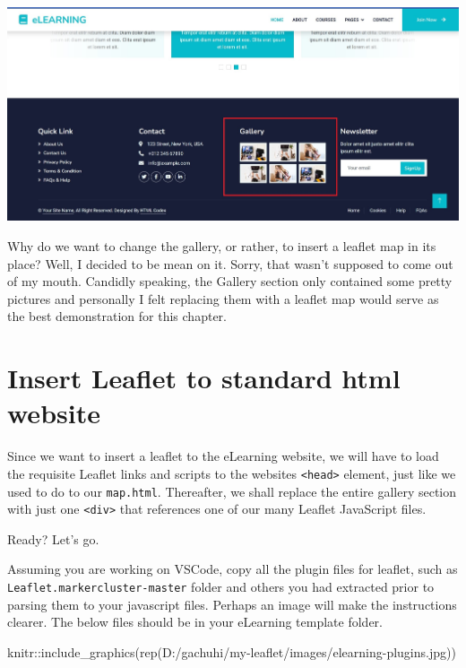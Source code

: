 \documentclass[
]{book}
\newenvironment{Shaded}{\begin{snugshade}}{\end{snugshade}}
\newcommand{\FunctionTok}[1]{\textcolor[rgb]{0.00,0.00,0.00}{#1}}
\newcommand{\NormalTok}[1]{#1}
\newcommand{\SpecialCharTok}[1]{\textcolor[rgb]{0.00,0.00,0.00}{#1}}
\newcommand{\StringTok}[1]{\textcolor[rgb]{0.31,0.60,0.02}{#1}}
\begin{document}
\includegraphics[width=26.14in]{../images/gallery}

Why do we want to change the gallery, or rather, to insert a leaflet map in its place? Well, I decided to be mean on it. Sorry, that wasn't supposed to come out of my mouth. Candidly speaking, the Gallery section only contained some pretty pictures and personally I felt replacing them with a leaflet map would serve as the best demonstration for this chapter.

\hypertarget{insert-leaflet-to-standard-html-website}{%
\section{Insert Leaflet to standard html website}\label{insert-leaflet-to-standard-html-website}}

Since we want to insert a leaflet to the eLearning website, we will have to load the requisite Leaflet links and scripts to the websites \texttt{\textless{}head\textgreater{}} element, just like we used to do to our \texttt{map.html}. Thereafter, we shall replace the entire gallery section with just one \texttt{\textless{}div\textgreater{}} that references one of our many Leaflet JavaScript files.

Ready? Let's go.

Assuming you are working on VSCode, copy all the plugin files for leaflet, such as \texttt{Leaflet.markercluster-master} folder and others you had extracted prior to parsing them to your javascript files. Perhaps an image will make the instructions clearer. The below files should be in your eLearning template folder.

\begin{Shaded}
\begin{Highlighting}[]
\NormalTok{knitr}\SpecialCharTok{::}\FunctionTok{include\_graphics}\NormalTok{(}\FunctionTok{rep}\NormalTok{(}\StringTok{\textquotesingle{}D:/gachuhi/my{-}leaflet/images/elearning{-}plugins.jpg\textquotesingle{}}\NormalTok{))}
\end{Highlighting}
\end{Shaded}
\end{document}
